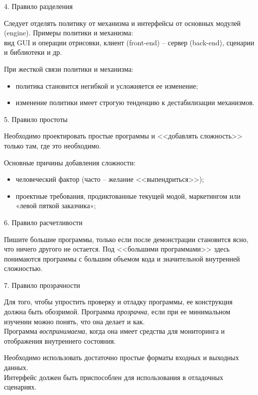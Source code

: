 \begin{frame}{4. Правило разделения}
	\begin{block}{Следует отделять политику от механизма и интерфейсы от основных модулей (engine).}
		Примеры политики и механизма:\\
		вид GUI и операции отрисовки, клиент (front-end) -- сервер (back-end), сценарии и библиотеки и др.
	\end{block}
	\pause
	При жесткой связи политики и механизма:
	\begin{itemize}
		\item политика становится негибкой и усложняется ее изменение;
		\item изменение политики имеет строгую тенденцию к дестабилизации механизмов.
	\end{itemize}
\end{frame}

\begin{frame}{5. Правило простоты}
	\begin{block}{Необходимо проектировать простые программы и <<добавлять сложность>> только там,  где это необходимо.}
	\end{block}
	\pause
	Основные причины добавления сложности:
	\begin{itemize}
		\item человеческий фактор (часто -- желание <<выпендриться>>);
		\item проектные требования,  продиктованные текущей модой,  маркетингом или «левой пяткой заказчика»;
	\end{itemize}
\end{frame}

\begin{frame}{6. Правило расчетливости}
	\begin{block}{Пишите большие программы,  только если после демонстрации становится ясно,  что ничего другого не остается.}
		Под <<большими программами>> здесь понимаются программы с большим объемом кода и значительной внутренней сложностью.
	\end{block}
\end{frame}

\begin{frame}{7. Правило прозрачности}
	\begin{block}{Для того,  чтобы упростить проверку и отладку программы,  ее конструкция должна быть обозримой.}
		\pause
		Программа {\itshape прозрачна}, если при ее минимальном изучении можно понять, что она делает и как.\\
		\pause
		Программа {\itshape воспринимаема},  когда она имеет средства для мониторинга и отображения внутреннего состояния.
	\end{block}
	\pause
	Необходимо использовать достаточно простые форматы входных и выходных данных.\\
	Интерфейс должен быть приспособлен для использования в отладочных сценариях.
\end{frame}

